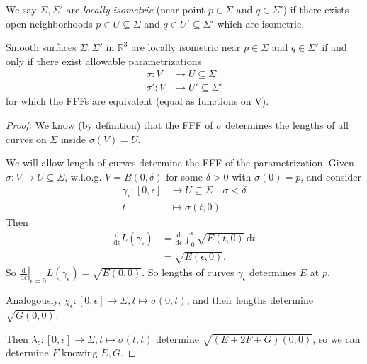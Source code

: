We say \(\Sigma, \Sigma'\) are \textit{locally isometric} (near point \(p \in \Sigma\) and \(q \in \Sigma'\)) if there exists open neighborhoods \(p \in U \subseteq \Sigma\) and \(q \in U' \subseteq \Sigma'\) which are isometric.
\begin{lemma}{}{}
    Smooth surfaces \(\Sigma, \Sigma'\) in \(\mathbb{R}^3\) are locally isometric near \(p \in \Sigma\) and \(q \in \Sigma'\) if and only if there exist allowable parametrizations
    \begin{align*}
        \sigma: V &\to U \subseteq \Sigma\\
        \sigma': V &\to U' \subseteq \Sigma'
    \end{align*}
    for which the FFFs are equivalent (equal as functions on V).
\end{lemma}
\begin{proof}
    We know (by definition) that the FFF of \(\sigma\) determines the lengths of all curves on \(\Sigma\) inside \(\sigma(V) = U\).

    We will allow length  of curves determine the FFF of the parametrization. Given \(\sigma: V \to U \subseteq \Sigma\), w.l.o.g. \(V = B(0,\delta)\) for some \(\delta > 0\) with \(\sigma(0) = p\), and consider
    \begin{align*}
        \gamma_\epsilon: [0, \epsilon] &\to U \subseteq \Sigma \quad \sigma<\delta\\
        t &\mapsto \sigma(t, 0).
    \end{align*}
    Then
    \begin{align*}
        \frac{\mathrm{d}}{\mathrm{d}\epsilon}L(\gamma_\epsilon) &= \frac{\mathrm{d}}{\mathrm{d}\epsilon} \int_{0}^{\epsilon} \sqrt{E(t,0)}  \,\mathrm{d}t\\
        &= \sqrt{E(\epsilon,0)}.
    \end{align*}
    So \(\left.\frac{\mathrm{d}}{\mathrm{d}\epsilon}\right|_{\epsilon=0}L(\gamma_\epsilon)= \sqrt{E(0,0)}\). So lengths of curves \(\gamma_\epsilon\) determines \(E\) at \(p\).

    Analogously, \(\chi_\epsilon: [0,\epsilon] \to \Sigma, t \mapsto \sigma(0,t)\), and their lengths determine \(\sqrt{G(0,0)}\).

    Then \(\lambda_\epsilon: [0,\epsilon] \to \Sigma, t \mapsto \sigma(t,t)\) determine \(\sqrt{(E + 2F + G)(0,0)}\), so we can determine \(F\) knowing \(E, G\).
\end{proof}
